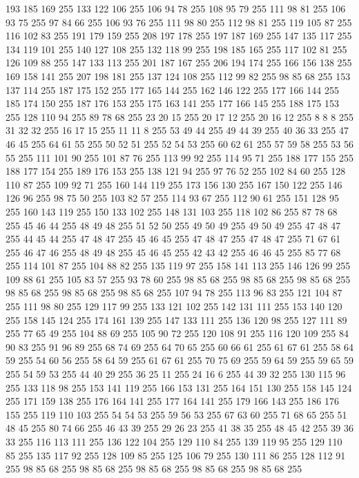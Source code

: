 193 185 169 255 133 122 106 255 106 94 78 255 108 95 79 255 111 98 81 255 106 93 75 255 97 84 66 255 106 93 76 255 111 98 80 255 112 98 81 255 119 105 87 255 116 102 83 255 191 179 159 255 208 197 178 255 197 187 169 255 147 135 117 255 134 119 101 255 140 127 108 255 132 118 99 255 198 185 165 255 117 102 81 255 126 109 88 255 147 133 113 255 201 187 167 255 206 194 174 255 166 156 138 255 169 158 141 255 207 198 181 255 137 124 108 255 112 99 82 255 98 85 68 255 153 137 114 255 187 175 152 255 177 165 144 255 162 146 122 255 177 166 144 255 185 174 150 255 187 176 153 255 175 163 141 255 177 166 145 255 188 175 153 255 128 110 94 255 89 78 68 255 23 20 15 255 20 17 12 255 20 16 12 255 8 8 8 255 31 32 32 255 16 17 15 255 11 11 8 255 53 49 44 255 49 44 39 255 40 36 33 255 47 46 45 255 64 61 55 255 50 52 51 255 52 54 53 255 60 62 61 255 57 59 58 255 53 56 55 255 111 101 90 255 101 87 76 255 113 99 92 255 114 95 71 255
188 177 155 255 188 177 154 255 189 176 153 255 138 121 94 255 97 76 52 255 102 84 60 255 128 110 87 255 109 92 71 255 160 144 119 255 173 156 130 255 167 150 122 255 146 126 96 255 98 75 50 255 103 82 57 255 114 93 67 255 112 90 61 255 151 128 95 255 160 143 119 255 150 133 102 255 148 131 103 255 118 102 86 255 87 78 68 255 45 46 44 255 48 49 48 255 51 52 50 255 49 50 49 255 49 50 49 255 47 48 47 255 44 45 44 255 47 48 47 255 45 46 45 255 47 48 47 255 47 48 47 255 71 67 61 255 46 47 46 255 48 49 48 255 45 46 45 255 42 43 42 255 46 46 45 255 85 77 68 255 114 101 87 255 104 88 82 255 135 119 97 255 158 141 113 255 146 126 99 255 109 88 61 255 105 83 57 255 93 78 60 255 98 85 68 255 98 85 68 255 98 85 68 255 98 85 68 255 98 85 68 255 98 85 68 255 107 94 78 255 113 96 83 255 121 104 87 255 111 98 80 255 129 117 99 255 133 121 102 255 142 131 111 255 153 140 120 255 158 145 124 255 174 161 139 255
147 133 111 255 136 120 98 255 127 111 89 255 77 65 49 255 104 88 69 255 105 90 72 255 120 108 91 255 116 120 109 255 84 90 83 255 91 96 89 255 68 74 69 255 64 70 65 255 60 66 61 255 61 67 61 255 58 64 59 255 54 60 56 255 58 64 59 255 61 67 61 255 70 75 69 255 59 64 59 255 59 65 59 255 54 59 53 255 44 40 29 255 36 25 11 255 24 16 6 255 44 39 32 255 130 115 96 255 133 118 98 255 153 141 119 255 166 153 131 255 164 151 130 255 158 145 124 255 171 159 138 255 176 164 141 255 177 164 141 255 179 166 143 255 186 176 155 255 119 110 103 255 54 54 53 255 59 56 53 255 67 63 60 255 71 68 65 255 51 48 45 255 80 74 66 255 46 43 39 255 29 26 23 255 41 38 35 255 48 45 42 255 39 36 33 255 116 113 111 255 136 122 104 255 129 110 84 255 139 119 95 255 129 110 85 255 135 117 92 255 128 109 85 255 125 106 79 255 130 111 86 255 128 112 91 255 98 85 68 255 98 85 68 255 98 85 68 255 98 85 68 255 98 85 68 255
